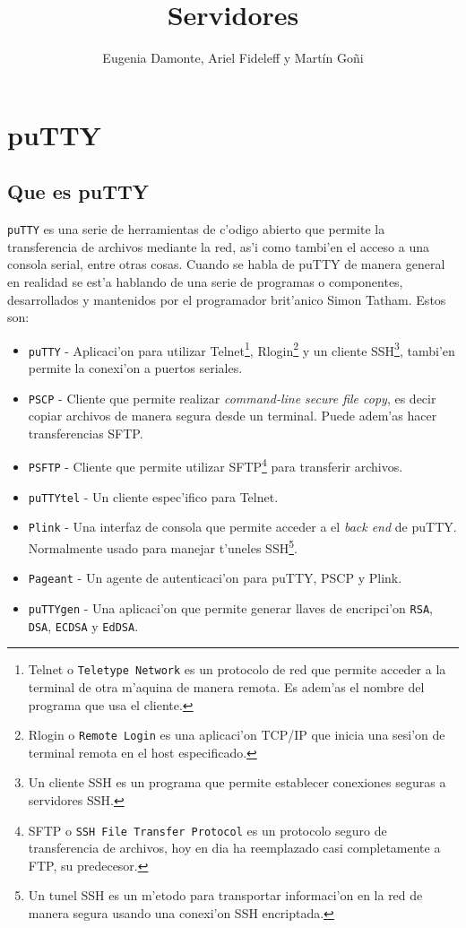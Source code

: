 \documentclass[11pt]{article}
\title{\Huge Servidores}
\author{Eugenia Damonte, Ariel Fideleff y Mart\'in Go\~ni}
\date{}
\begin{document}
	\maketitle
	\newpage
	\tableofcontents
	\newpage
	
	
	\section{puTTY}
	\subsection{Que es puTTY}
		\texttt{puTTY} es una serie de herramientas de c'odigo abierto que permite la transferencia de archivos mediante la red, as'i como tambi'en el acceso a una consola serial, entre otras cosas. Cuando se habla de puTTY de manera general en realidad se est'a hablando de una serie de programas o componentes, desarrollados y mantenidos por el programador brit'anico Simon Tatham. Estos son:
		
		\begin{itemize}
			\item \texttt{puTTY} - Aplicaci'on para utilizar Telnet\footnote{Telnet o \texttt{Teletype Network} es un protocolo de red que permite acceder a la terminal de otra m'aquina de manera remota. Es adem'as el nombre del programa que usa el cliente.}, Rlogin\footnote{Rlogin o \texttt{Remote Login} es una aplicaci'on TCP/IP que inicia una sesi'on de terminal remota en el host especificado.} y un cliente SSH\footnote{Un cliente SSH es un programa que permite establecer conexiones seguras a servidores SSH.}, tambi'en permite la conexi'on a puertos seriales.
			\item \texttt{PSCP} - Cliente que permite realizar \textit{command-line secure file copy}, es decir copiar archivos de manera segura desde un terminal. Puede adem'as hacer transferencias SFTP.
			\item \texttt{PSFTP} - Cliente que permite utilizar SFTP\footnote{SFTP o \texttt{SSH File Transfer Protocol} es un protocolo seguro de transferencia de archivos, hoy en dia ha reemplazado casi completamente a FTP, su predecesor.} para transferir archivos.
			\item \texttt{puTTYtel} - Un cliente espec'ifico para Telnet.
			\item \texttt{Plink} - Una interfaz de consola que permite acceder a el \textit{back end} de puTTY. Normalmente usado para manejar t'uneles SSH\footnote{Un tunel SSH es un m'etodo para transportar informaci'on en la red de manera segura usando una conexi'on SSH encriptada.}.
			\item \texttt{Pageant} - Un agente de autenticaci'on para puTTY, PSCP y Plink.
			\item \texttt{puTTYgen} - Una aplicaci'on que permite generar llaves de encripci'on \texttt{RSA}, \texttt{DSA}, \texttt{ECDSA} y \texttt{EdDSA}.
		\end{itemize}
		
\end{document}
